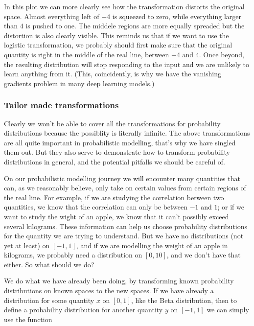 \documentclass[11pt]{article}
\begin{document}
In this plot we can more clearly see how the transformation distorts the original space. Almost everything left of \(-4\) is squeezed to zero, while everything larger than \(4\) is pushed to one. The middele regions are more equally spreaded but the distortion is also clearly visible. This reminds us that if we want to use the logistic transformation, we probably should first make sure that the original quantity is right in the middle of the real line, between \(-4\) and \(4\). Once beyond, the resulting distribution will stop responding to the input and we are unlikely to learn anything from it. (This, coincidently, is why we have the vanishing gradients problem in many deep learning models.)

\subsubsection{Tailor made transformations}
\label{sec:org66721dd}

Clearly we won't be able to cover all the transformations for probability distributions because the possiblity is literally infinite. The above transformations are all quite important in probabilistic modelling, that's why we have singled them out. But they also serve to demonstrate how to transform probability distributions in general, and the potential pitfalls we should be careful of.

On our probabilistic modelling journey we will encounter many quantities that can, as we reasonably believe, only take on certain values from certain regions of the real line. For example, if we are studying the correlation between two quantities, we know that the correlation can only be between \(-1\) and \(1\); or if we want to study the wight of an apple, we know that it can't possibly exceed several kilograms. These information can help us choose probability distributions for the quantity we are trying to understand. But we have no distributions (not yet at least) on \([-1, 1]\), and if we are modelling the weight of an apple in kilograms, we probably need a distribution on \([0, 10]\), and we don't have that either. So what should we do?

We do what we have already been doing, by transforming known probability distributions on known spaces to the new spaces. If we have already a distribution for some quantity \(x\) on \([0, 1]\), like the Beta distribution, then to define a probability distribution for another quantity \(y\) on \([-1, 1]\) we can simply use the function
\end{document}
